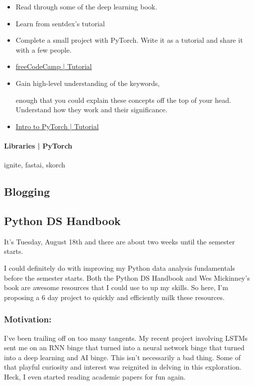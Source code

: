 \begin{itemize}
	\item
	Read through some of the deep learning book.

	\item
	Learn from sentdex's tutorial

	\item
	Complete a small project with PyTorch. Write it as a tutorial and share it with a few people.

	\item
	\href{https://youtu.be/GIsg-ZUy0MY}{freeCodeCamp | Tutorial}

	\item
	Gain high-level understanding of the keywords,

	enough that you could explain these concepts off the top of your head. Understand how they work and their significance.

	\item
	\href{https://youtu.be/pWrwyOsho5A}{Intro to PyTorch | Tutorial}
\end{itemize}

\paragraph*{Libraries | PyTorch}
ignite, fastai, skorch


\subsection{Blogging}

\subsection{Python DS Handbook}

It's Tuesday, August 18th and there are about two weeks until the semester starts.

I could definitely do with improving my Python data analysis fundamentals  before the semester starts. Both the Python DS Handbook and Wes Mickinney's book are awesome resources that I could use to up my skills. So here, I'm proposing a 6 day project to quickly and efficiently milk these resources.

\subsubsection*{Motivation:}
I've been trailing off on too many tangents. My recent project involving LSTMs sent me on an RNN binge that turned into a neural network binge that turned into a deep learning and AI binge. This isn't necessarily a bad thing. Some of that playful curiosity and interest was reignited in delving in this exploration. Heck, I even started reading academic papers for fun again.

